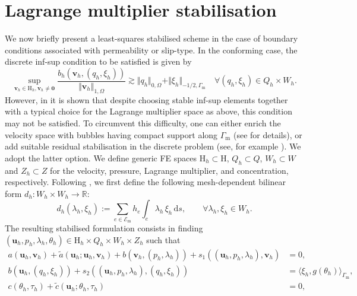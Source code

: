 \documentclass[onefignum,onetabnum,reqno,a4paper,final]{siamart250211}
\newcommand\bu{\boldsymbol{u}}
\newcommand\bv{\boldsymbol{v}}
\newcommand\0{\mathbf{0}}
\newcommand\bH{\boldsymbol{\mathrm{H}}}
\newcommand\Gm{\Gamma_{\mathrm{m}}}
\numberwithin{figure}{section}
\numberwithin{table}{section}
\begin{document}
	\section{Lagrange multiplier stabilisation}
	\label{sec:lagrange-multiplier}
	We now briefly present a least-squares stabilised scheme %
	in the case of boundary conditions associated with permeability or slip-type.
	In the conforming case, the discrete inf-sup condition to be satisfied is given by
	\[
	\sup_{\bv_h\in \bH_h,\bv_h\neq\boldsymbol{0}}\frac{
		b_h(\bv_h,(q_h,\xi_h)) 
	}{\Vert\bv_h\Vert_{1,\Omega}}\gtrsim \Vert q_h\Vert_{0,\Omega}+\Vert \xi_h\Vert_{-1/2,\Gm} \quad \forall (q_h,\xi_h)\in Q_h\times W_h. %
	\]
	However, in \cite{verfurth86} it is shown that despite choosing stable inf-sup elements together with a typical choice for the Lagrange multiplier space as above, this condition may not be satisfied.  To circumvent this difficulty, one can either enrich the velocity space with bubbles having compact support along $\Gm$ (see \cite{verfurth86} for details), or add suitable residual stabilisation in the discrete problem (see, for example \cite{verfurth91,urquiza2014weak}). We adopt the latter option. 
	We define generic FE spaces $\bH_h\subset\bH$, $Q_h\subset Q$, $W_h\subset W$ and $Z_h\subset Z$ for the velocity, pressure, Lagrange multiplier, and concentration, respectively.
	Following  \cite{urquiza2014weak},  we first define the following mesh-dependent bilinear form $d_h:W_h\times W_h\to \mathbb{R}$: 
	\begin{equation}
		\label{eq:normH-1/2}
		d_h(\lambda_h,\xi_h)%
		:=\sum_{e\in\mathcal{E}_{\mathrm{m}}}h_e\int_{e}\lambda_h\,\xi_h\,\mathrm{d}s, \qquad \forall \lambda_h,\xi_h\in W_h.
	\end{equation}
	The resulting stabilised formulation consists in finding $(\bu_h,p_h,\lambda_h,\theta_h)\in \bH_h\times Q_h\times W_h\times Z_h$ such that
	\begin{equation}
		\label{eq:cross-flow-fv1-discrete-conforming-stabilised}
		\begin{aligned}
			a(\bu_h,\bv_h)+ \widetilde{a}(\bu_h;\bu_h,\bv_h) + b(\bv_h,(p_h,\lambda_h)) +s_1((\bu_h,p_h,\lambda_h),\bv_h) &=0 ,\\
			b(\bu_h,(q_h,\xi_h))+s_2((\bu_h,p_h,\lambda_h),(q_h,\xi_h)) &= \langle\xi_h, g(\theta_h)\rangle_{\Gm} ,\\
			c(\theta_h,\tau_h) + \widetilde{c}(\bu_h;\theta_h,\tau_h)&=0,
		\end{aligned}
	\end{equation}
\end{document}
